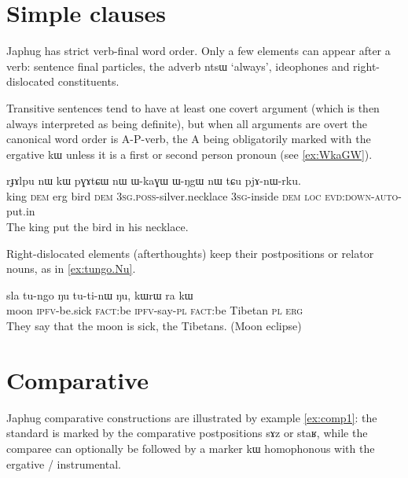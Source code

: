 \documentclass[oldfontcommands,oneside,a4paper,11pt]{article}
\newcommand{\ipa}[1]{{\phon #1}} %
\begin{document}
\section{Simple clauses} 

Japhug has strict verb-final word order. Only a few elements can appear after a verb: sentence final particles, the adverb \ipa{ntsɯ} `always', ideophones and right-dislocated constituents.

Transitive sentences tend to have at least one covert argument (which is then always interpreted as being definite), but when all arguments are overt the canonical word order is A-P-verb, the A being obligatorily marked with the ergative \ipa{kɯ} unless it is a first or second person pronoun (see \ref{ex:WkaGW}).

\begin{exe}
\ex \label{ex:WkaGW}
\gll
\ipa{rɟɤlpu} 	\ipa{nɯ} 	\ipa{kɯ} 	\ipa{pɣɤtɕɯ} 	\ipa{nɯ} 	\ipa{ɯ-kaɣɯ} 	\ipa{ɯ-ŋgɯ} 	\ipa{nɯ} 	\ipa{tɕu} 	\ipa{pjɤ-nɯ-rku.} \\
king \textsc{dem} erg bird \textsc{dem} \textsc{3sg.poss}-silver.necklace \textsc{3sg}-inside \textsc{dem} \textsc{loc} \textsc{evd:down-auto}-put.in \\
\glt The king put the bird in his necklace.
\end{exe}

Right-dislocated elements (afterthoughts) keep their postpositions or relator nouns, as in \ref{ex:tungo.Nu}.

\begin{exe}
\ex \label{ex:tungo.Nu}
\gll
\ipa{sla} 	\ipa{tu-ngo} 	\ipa{ŋu} 	\ipa{tu-ti-nɯ} 	\ipa{ŋu,} 	\ipa{kɯrɯ} 	\ipa{ra} 	\ipa{kɯ} \\
moon \textsc{ipfv}-be.sick \textsc{fact}:be \textsc{ipfv}-say-\textsc{pl} \textsc{fact}:be  Tibetan \textsc{pl} \textsc{erg} \\
\glt They say that the moon is sick, the Tibetans. (Moon eclipse)
\end{exe}

\section{Comparative}

Japhug comparative constructions are illustrated by example \ref{ex:comp1}: the standard is marked by the comparative postpositions \ipa{sɤz} or \ipa{staʁ}, while the comparee can optionally be followed by a marker \ipa{kɯ} homophonous with the ergative / instrumental.
\end{document}
